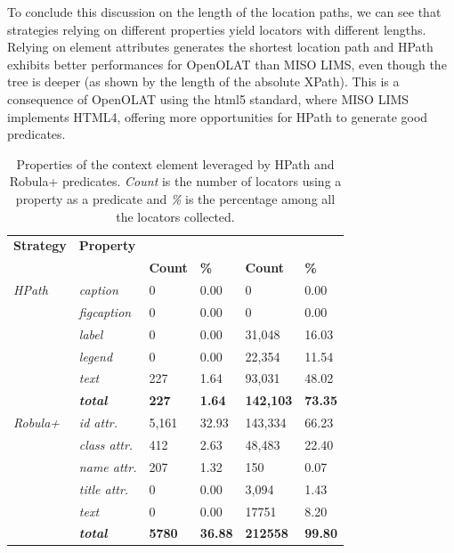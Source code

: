 To conclude this discussion on the length of the location paths, we can see that strategies relying on different properties yield locators with different lengths. Relying on element attributes generates the shortest location path and HPath exhibits better performances for OpenOLAT than MISO LIMS, even though the tree is deeper (as shown by the length of the absolute XPath). This is a consequence of OpenOLAT using the \gls{html}5 standard, where MISO LIMS implements HTML4, offering more opportunities for HPath to generate good predicates.

\begin{table}
\centering
\caption{Properties of the context element leveraged by HPath and Robula+ predicates. \emph{Count} is the number of locators using a property as a predicate and \emph{\%} is the percentage among all the locators collected.}
\label{tab:hpath-results-properties}
\begin{tabular}{>{\raggedright}m{0.4in}>{\raggedright}m{0.5in}>{\raggedleft}m{0.4in} >{\raggedleft}m{0.4in}>{\raggedleft}m{0.5in} >{\raggedleft}m{0.4in}}
\toprule
\textbf{\scriptsize{Strategy}} & \textbf{\scriptsize{Property}} & \multicolumn{2}{c}{\textbf{\scriptsize{MISO LIMS}}} & \multicolumn{2}{c}{\textbf{\scriptsize{OpenOLAT}}}\tabularnewline
&   & \textbf{\scriptsize{Count}} & \textbf{\scriptsize{\%}} & \textbf{\scriptsize{Count}} & \textbf{\scriptsize{\%}}\tabularnewline
\toprule
\scriptsize{\textit{HPath}} & \scriptsize{\textit{caption}} & \scriptsize{0} & \scriptsize{0.00} & \scriptsize{0} & \scriptsize{0.00}\tabularnewline
& \scriptsize{\textit{figcaption}} & \scriptsize{0} & \scriptsize{0.00} & \scriptsize{0} & \scriptsize{0.00}\tabularnewline
& \scriptsize{\textit{label}} & \scriptsize{0} & \scriptsize{0.00} & \scriptsize{31,048} & \scriptsize{16.03}\tabularnewline
& \scriptsize{\textit{legend}} & \scriptsize{0} & \scriptsize{0.00} & \scriptsize{22,354} & \scriptsize{11.54}\tabularnewline
& \scriptsize{\textit{text}} & \scriptsize{227} & \scriptsize{1.64} & \scriptsize{93,031} & \scriptsize{48.02}\tabularnewline
& \scriptsize{\textit{\textbf{total}}} & \scriptsize{\textbf{227}} & \scriptsize{\textbf{1.64}} & \scriptsize{\textbf{142,103}} & \scriptsize{\textbf{73.35}}\tabularnewline
\hline
\scriptsize{\textit{Robula+}} & \scriptsize{\textit{id attr.}} & \scriptsize{5,161} & \scriptsize{32.93} & \scriptsize{143,334} & \scriptsize{66.23}\tabularnewline
& \scriptsize{\textit{class attr.}} & \scriptsize{412} & \scriptsize{2.63} & \scriptsize{48,483} & \scriptsize{22.40}\tabularnewline
& \scriptsize{\textit{name attr.}} & \scriptsize{207} & \scriptsize{1.32} & \scriptsize{150} & \scriptsize{0.07}\tabularnewline
& \scriptsize{\textit{title attr.}} & \scriptsize{0} & \scriptsize{0.00} & \scriptsize{3,094} & \scriptsize{1.43}\tabularnewline
& \scriptsize{\textit{text}} & \scriptsize{0} & \scriptsize{0.00} & \scriptsize{17751} & \scriptsize{8.20}\tabularnewline
& \scriptsize{\textit{\textbf{total}}} & \scriptsize{\textbf{5780}} & \scriptsize{\textbf{36.88}} & \scriptsize{\textbf{212558}} & \scriptsize{\textbf{99.80}}\tabularnewline
\bottomrule
\end{tabular}
\end{table}

